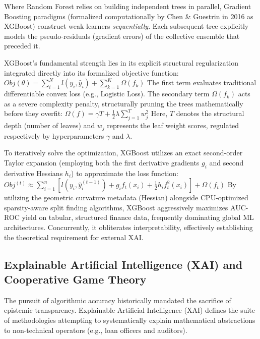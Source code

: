 Where Random Forest relies on building independent trees in parallel,
Gradient Boosting paradigms (formalized computationally by Chen \&
Guestrin in 2016 as XGBoost) construct weak learners
\emph{sequentially}. Each subsequent tree explicitly models the
pseudo-residuals (gradient errors) of the collective ensemble that
preceded it.

XGBoost's fundamental strength lies in its explicit structural
regularization integrated directly into its formalized objective
function:
\(Obj(\theta) = \sum_{i=1}^{N} l(y_i, \hat{y}_i) + \sum_{k=1}^{K} \Omega(f_k)\)
The first term evaluates traditional differentiable convex loss (e.g.,
Logistic Loss). The secondary term \(\Omega(f_k)\) acts as a severe
complexity penalty, structurally pruning the trees mathematically before
they overfit:
\(\Omega(f) = \gamma T + \frac{1}{2} \lambda \sum_{j=1}^{T} w_j^2\)
Here, \(T\) denotes the structural depth (number of leaves) and \(w_j\)
represents the leaf weight scores, regulated respectively by
hyperparameters \(\gamma\) and \(\lambda\).

To iteratively solve the optimization, XGBoost utilizes an exact
second-order Taylor expansion (employing both the first derivative
gradients \(g_i\) and second derivative Hessians \(h_i\)) to approximate
the loss function:
\(Obj^{(t)} \approx \sum_{i=1}^{n} [l(y_i, \hat{y}^{(t-1)}_i) + g_i f_t(x_i) + \frac{1}{2} h_i f_t^2(x_i)] + \Omega(f_t)\)
By utilizing the geometric curvature metadata (Hessian) alongside
CPU-optimized sparsity-aware split finding algorithms, XGBoost
aggressively maximizes AUC-ROC yield on tabular, structured finance
data, frequently dominating global ML architectures. Concurrently, it
obliterates interpretability, effectively establishing the theoretical
requirement for external XAI.

\hypertarget{explainable-artificial-intelligence-xai-and-cooperative-game-theory}{%
\subsection{Explainable Artificial Intelligence (XAI) and Cooperative
Game
Theory}\label{explainable-artificial-intelligence-xai-and-cooperative-game-theory}}

The pursuit of algorithmic accuracy historically mandated the sacrifice
of epistemic transparency. Explainable Artificial Intelligence (XAI)
defines the suite of methodologies attempting to systematically explain
mathematical abstractions to non-technical operators (e.g., loan
officers and auditors).

